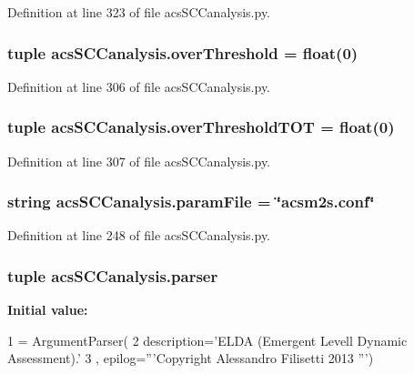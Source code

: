 Definition at line 323 of file acs\-S\-C\-Canalysis.\-py.

\hypertarget{a00128_a12e61f8d7aadb52256a7728af342bae3}{
\subsubsection[{over\-Threshold}]{\setlength{\rightskip}{0pt plus 5cm}tuple acs\-S\-C\-Canalysis.\-over\-Threshold = float(0)}}\label{a00128_a12e61f8d7aadb52256a7728af342bae3}


Definition at line 306 of file acs\-S\-C\-Canalysis.\-py.

\hypertarget{a00128_a93de20dd9ebf791127ac5aefc0a2df8d}{
\subsubsection[{over\-Threshold\-T\-O\-T}]{\setlength{\rightskip}{0pt plus 5cm}tuple acs\-S\-C\-Canalysis.\-over\-Threshold\-T\-O\-T = float(0)}}\label{a00128_a93de20dd9ebf791127ac5aefc0a2df8d}


Definition at line 307 of file acs\-S\-C\-Canalysis.\-py.

\hypertarget{a00128_a7160f8e48b4aafebbd75e9037fc9fef7}{
\subsubsection[{param\-File}]{\setlength{\rightskip}{0pt plus 5cm}string acs\-S\-C\-Canalysis.\-param\-File = \char`\"{}acsm2s.\-conf\char`\"{}}}\label{a00128_a7160f8e48b4aafebbd75e9037fc9fef7}


Definition at line 248 of file acs\-S\-C\-Canalysis.\-py.

\hypertarget{a00128_ae47150d99d4a8e7173bb73a271c4a740}{
\subsubsection[{parser}]{\setlength{\rightskip}{0pt plus 5cm}tuple acs\-S\-C\-Canalysis.\-parser}}\label{a00128_ae47150d99d4a8e7173bb73a271c4a740}
{\bfseries Initial value\-:}
\begin{DoxyCode}
1 = ArgumentParser(
2                                 description=\textcolor{stringliteral}{'ELDA (Emergent Levell Dynamic       Assessment).'}
3                                 , epilog=\textcolor{stringliteral}{'''Copyright Alessandro Filisetti 2013 '''})
\end{DoxyCode}


